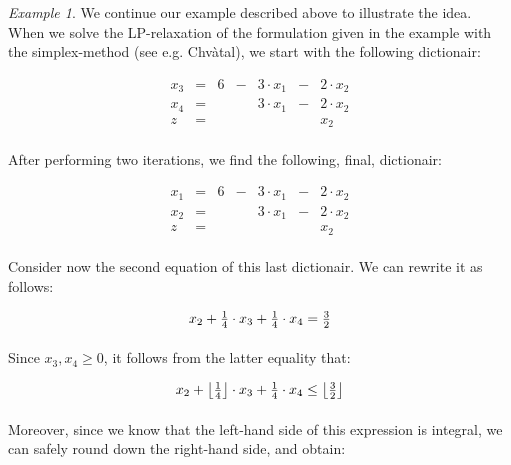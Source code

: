 \documentclass[titlepage]{book}
\theoremstyle{plain}
\theoremstyle{definition}
\theoremstyle{remark}
\newtheorem{example}{Example}
\begin{document}
\begin{example}
We continue our example described above to illustrate the idea. When we solve the LP-relaxation of the formulation given in the example with the simplex-method (see e.g. Chv\`atal\cite{Chvatal/83/Linear}), we start with the following dictionair:

\begin{equation}
\begin{array}{rcrcrcr}
x_3&=&6&-&3\cdot x_1&-&2\cdot x_2\\
x_4&=&&&3\cdot x_1&-&2\cdot x_2\\\hline
z&=&&&&&x_2
\end{array}
\end{equation}

\paragraph{}
After performing two iterations, we find the following, final, dictionair:

\begin{equation}
\begin{array}{rcrcrcr}
x_1&=&6&-&3\cdot x_1&-&2\cdot x_2\\
x_2&=&&&3\cdot x_1&-&2\cdot x_2\\\hline
z&=&&&&&x_2
\end{array}
\end{equation}

\paragraph{}
Consider now the second equation of this last dictionair. We can rewrite it as follows:

\begin{equation}
x_2+\tfrac{1}{4}\cdot x_3+\tfrac{1}{4}\cdot x_4=\tfrac{3}{2}\eqnlab{cg-cut-eq2-ini}
\end{equation}

\paragraph{}
Since $x_3,x_4\geq 0$, it follows from the latter equality that:

\begin{equation}
x_2+\left\lfloor \tfrac{1}{4} \right\rfloor\cdot x_3+\tfrac{1}{4}\cdot x_4\leq\left\lfloor \tfrac{3}{2} \right\rfloor
\end{equation}

\paragraph{}
Moreover, since we know that the left-hand side of this expression is integral, we can safely round down the right-hand side, and obtain:


\end{example}
\end{document}
